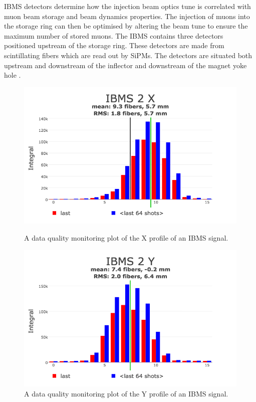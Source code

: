 IBMS detectors determine how the injection beam optics tune is correlated with muon beam storage and beam dynamics properties. The injection of muons into the storage ring can then be optimised by altering the beam tune to ensure the maximum number of stored muons. The IBMS contains three detectors positioned upstream of the storage ring. These detectors are made from scintillating fibers which are read out by SiPMs. The detectors are situated both upstream and downstream of the inflector and downstream of the magnet yoke hole \cite{ibmsref1}\cite{ibmsref2}.  

\begin{figure}[htbp]
	\centering
	\begin{minipage}[t]{11cm}
		\centering
		\includegraphics[scale=0.45]{Figures/IBMS2_X_DQM.png}
		\caption{A data quality monitoring plot of the X profile of an IBMS signal.}
		\label{fig:IBMS2_X_DQM.png}
	\end{minipage}
	\hspace{3cm}
	\begin{minipage}[t]{11cm}
		\centering
		\includegraphics[scale=0.45]{Figures/IBMS2_Y_DQM.png}
		\caption{A data quality monitoring plot of the Y profile of an IBMS signal.}
		\label{fig:IBMS2_Y_DQM.png}
	\end{minipage}
	\end{figure}

